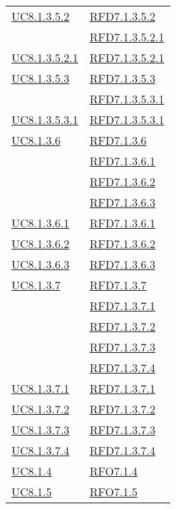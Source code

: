 \begin{longtable}{|>{\centering}m{5cm}|m{5cm}<{\centering}|}
\hyperref[UC8.1.3.5.2]{UC8.1.3.5.2} & \hyperlink{RFD7.1.3.5.2}{RFD7.1.3.5.2}\\
& \hyperlink{RFD7.1.3.5.2.1}{RFD7.1.3.5.2.1}\\ \hline
\hyperref[UC8.1.3.5.2.1]{UC8.1.3.5.2.1} & \hyperlink{RFD7.1.3.5.2.1}{RFD7.1.3.5.2.1}\\ \hline
\hyperref[UC8.1.3.5.3]{UC8.1.3.5.3} & \hyperlink{RFD7.1.3.5.3}{RFD7.1.3.5.3}\\
& \hyperlink{RFD7.1.3.5.3.1}{RFD7.1.3.5.3.1}\\ \hline
\hyperref[UC8.1.3.5.3.1]{UC8.1.3.5.3.1} & \hyperlink{RFD7.1.3.5.3.1}{RFD7.1.3.5.3.1}\\ \hline
\hyperref[UC8.1.3.6]{UC8.1.3.6} & \hyperlink{RFD7.1.3.6}{RFD7.1.3.6}\\
& \hyperlink{RFD7.1.3.6.1}{RFD7.1.3.6.1}\\
& \hyperlink{RFD7.1.3.6.2}{RFD7.1.3.6.2}\\
& \hyperlink{RFD7.1.3.6.3}{RFD7.1.3.6.3}\\ \hline
\hyperref[UC8.1.3.6.1]{UC8.1.3.6.1} & \hyperlink{RFD7.1.3.6.1}{RFD7.1.3.6.1}\\ \hline
\hyperref[UC8.1.3.6.2]{UC8.1.3.6.2} & \hyperlink{RFD7.1.3.6.2}{RFD7.1.3.6.2}\\ \hline
\hyperref[UC8.1.3.6.3]{UC8.1.3.6.3} & \hyperlink{RFD7.1.3.6.3}{RFD7.1.3.6.3}\\ \hline
\hyperref[UC8.1.3.7]{UC8.1.3.7} & \hyperlink{RFD7.1.3.7}{RFD7.1.3.7}\\
& \hyperlink{RFD7.1.3.7.1}{RFD7.1.3.7.1}\\
& \hyperlink{RFD7.1.3.7.2}{RFD7.1.3.7.2}\\
& \hyperlink{RFD7.1.3.7.3}{RFD7.1.3.7.3}\\
& \hyperlink{RFD7.1.3.7.4}{RFD7.1.3.7.4}\\ \hline
\hyperref[UC8.1.3.7.1]{UC8.1.3.7.1} & \hyperlink{RFD7.1.3.7.1}{RFD7.1.3.7.1}\\ \hline
\hyperref[UC8.1.3.7.2]{UC8.1.3.7.2} & \hyperlink{RFD7.1.3.7.2}{RFD7.1.3.7.2}\\ \hline
\hyperref[UC8.1.3.7.3]{UC8.1.3.7.3} & \hyperlink{RFD7.1.3.7.3}{RFD7.1.3.7.3}\\ \hline
\hyperref[UC8.1.3.7.4]{UC8.1.3.7.4} & \hyperlink{RFD7.1.3.7.4}{RFD7.1.3.7.4}\\ \hline
\hyperref[UC8.1.4]{UC8.1.4} & \hyperlink{RFO7.1.4}{RFO7.1.4}\\ \hline
\hyperref[UC8.1.5]{UC8.1.5} & \hyperlink{RFO7.1.5}{RFO7.1.5}\\ \hline

\end{longtable}
